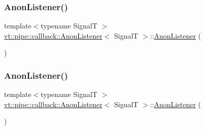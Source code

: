 \mbox{\label{structvt_1_1pipe_1_1callback_1_1_anon_listener_aa118ce8196dc5ae4bcce9c076c13fe96}} 
\subsubsection{\texorpdfstring{Anon\+Listener()}{AnonListener()}\hspace{0.1cm}{\footnotesize\ttfamily [2/5]}}
{\footnotesize\ttfamily template$<$typename SignalT $>$ \\
\hyperlink{structvt_1_1pipe_1_1callback_1_1_anon_listener}{vt\+::pipe\+::callback\+::\+Anon\+Listener}$<$ SignalT $>$\+::\hyperlink{structvt_1_1pipe_1_1callback_1_1_anon_listener}{Anon\+Listener} (\begin{DoxyParamCaption}\item[{\hyperlink{structvt_1_1pipe_1_1callback_1_1_anon_listener}{Anon\+Listener}$<$ SignalT $>$ const \&}]{ }\end{DoxyParamCaption})\hspace{0.3cm}{\ttfamily [default]}}

\mbox{\label{structvt_1_1pipe_1_1callback_1_1_anon_listener_aa6d501a31dc807d01a6b71bc2011e90d}} 
\subsubsection{\texorpdfstring{Anon\+Listener()}{AnonListener()}\hspace{0.1cm}{\footnotesize\ttfamily [3/5]}}
{\footnotesize\ttfamily template$<$typename SignalT $>$ \\
\hyperlink{structvt_1_1pipe_1_1callback_1_1_anon_listener}{vt\+::pipe\+::callback\+::\+Anon\+Listener}$<$ SignalT $>$\+::\hyperlink{structvt_1_1pipe_1_1callback_1_1_anon_listener}{Anon\+Listener} (\begin{DoxyParamCaption}\item[{\hyperlink{structvt_1_1pipe_1_1callback_1_1_anon_listener}{Anon\+Listener}$<$ SignalT $>$ \&\&}]{ }\end{DoxyParamCaption})\hspace{0.3cm}{\ttfamily [default]}}

